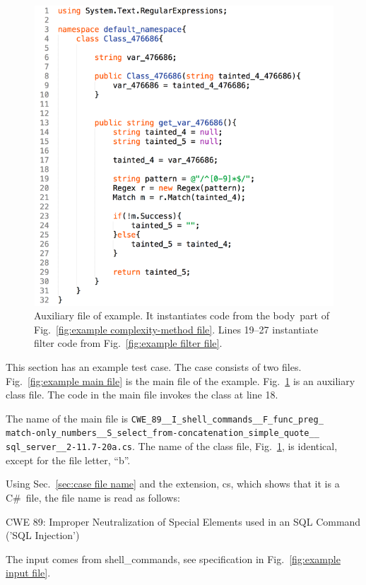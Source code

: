 \documentclass[12pt]{article}
\newcommand{\CSharp}{C{\fontseries{b}\selectfont\#}}
\begin{document}
\begin{figure}[htbp]
  \includegraphics[width=0.85\linewidth]{fig_example_code2.png}
  \caption{Auxiliary file of example.  It instantiates code from the
    \texlangle body\texrangle\ part of Fig.~\ref{fig:example complexity-method file}.
    Lines 19--27 instantiate filter code
    from Fig.~\ref{fig:example filter file}.}
  \label{fig:example aux file}
\end{figure}

This section has an example test case.  The case consists of 
two files.
Fig.~\ref{fig:example main file} is the main file of the example.  
Fig.~\ref{fig:example aux file} is an auxiliary class file.  
The code in
the main file invokes the class at line 18.

The name of the main file is
\verb|CWE_89__I_shell_commands__F_func_preg_| \\
\verb|match-only_numbers__S_select_from-concatenation_simple_quote__| \\
\verb|sql_server__2-11.7-20a.cs|.
The name of the class file, Fig.~\ref{fig:example aux file}, is
identical, except for the
file letter, ``b''.

Using Sec.~\ref{sec:case file name} and the extension, cs, which shows that it is a
\CSharp\ file, the file name is read as follows:

\noindent CWE 89: Improper Neutralization of Special Elements used in an SQL Command
('SQL Injection') \cite{CWE89}

\noindent The input comes from shell\_commands, see specification in
Fig.~\ref{fig:example input file}.
\end{document}
